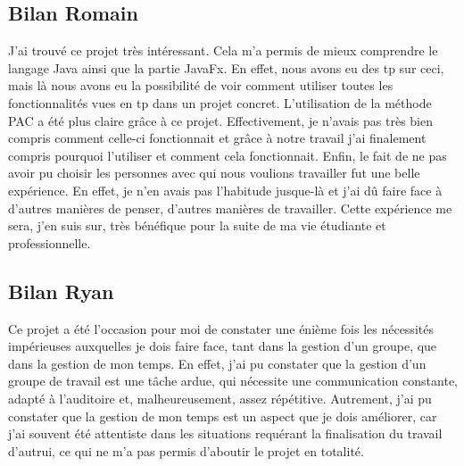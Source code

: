 \subsection{Bilan Romain}
J'ai trouvé ce projet très intéressant. Cela m'a permis de mieux comprendre le langage Java ainsi que la partie JavaFx. En effet, nous avons eu des tp sur ceci, mais là nous avons eu la possibilité de voir comment utiliser toutes les fonctionnalités vues en tp dans un projet concret. L'utilisation de la méthode PAC a été plus claire grâce à ce projet. Effectivement, je n'avais pas très bien compris comment celle-ci fonctionnait et grâce à notre travail j'ai finalement compris pourquoi l'utiliser et comment cela fonctionnait. Enfin, le fait de ne pas avoir pu choisir les personnes avec qui nous voulions travailler fut une belle expérience. En effet, je n'en avais pas l'habitude jusque-là et j'ai dû faire face à d'autres manières de penser, d'autres manières de travailler. Cette expérience me sera, j'en suis sur, très bénéfique pour la suite de ma vie étudiante et professionnelle.
\subsection{Bilan Ryan}
Ce projet a été l'occasion pour moi de constater une énième fois les nécessités impérieuses auxquelles je dois faire face, tant dans la gestion d'un groupe, que dans la gestion de mon temps. En effet, j'ai pu constater que la gestion d'un groupe de travail est une tâche ardue, qui nécessite une communication constante, adapté à l'auditoire et, malheureusement, assez répétitive. Autrement, j'ai pu constater que la gestion de mon temps est un aspect que je dois améliorer, car j'ai souvent été attentiste dans les situations requérant la finalisation du travail d'autrui, ce qui ne m'a pas permis d'aboutir le projet en totalité. 